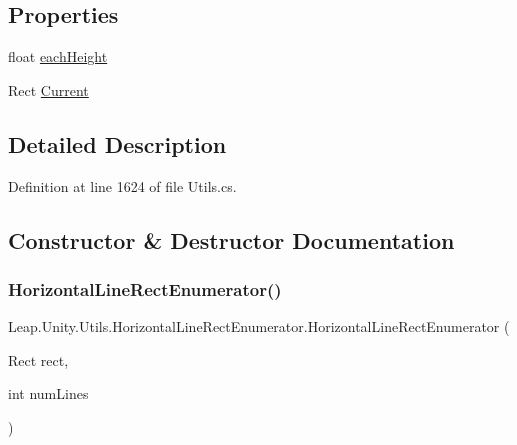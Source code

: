 \subsection*{Properties}
\begin{DoxyCompactItemize}
\item 
float \mbox{\hyperlink{struct_leap_1_1_unity_1_1_utils_1_1_horizontal_line_rect_enumerator_aaa16d5668db6d91b3138a02f5141c50a}{each\+Height}}
\item 
Rect \mbox{\hyperlink{struct_leap_1_1_unity_1_1_utils_1_1_horizontal_line_rect_enumerator_a6d9d80615e7c64ebc190cd27988ee577}{Current}}
\end{DoxyCompactItemize}


\subsection{Detailed Description}


Definition at line 1624 of file Utils.\+cs.



\subsection{Constructor \& Destructor Documentation}
\mbox{\label{struct_leap_1_1_unity_1_1_utils_1_1_horizontal_line_rect_enumerator_ac145ae10d58eccdf92e6e0c1acb1e1dc}} 
\subsubsection{\texorpdfstring{HorizontalLineRectEnumerator()}{HorizontalLineRectEnumerator()}}
{\footnotesize\ttfamily Leap.\+Unity.\+Utils.\+Horizontal\+Line\+Rect\+Enumerator.\+Horizontal\+Line\+Rect\+Enumerator (\begin{DoxyParamCaption}\item[{Rect}]{rect,  }\item[{int}]{num\+Lines }\end{DoxyParamCaption})}



